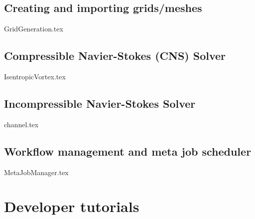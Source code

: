 \documentclass[a4paper,10pt]{report} %
\begin{document}
\chapter{Creating and importing grids/meshes }
\label{sec:GridCreation}
{GridGeneration.tex}



\chapter{Compressible Navier-Stokes (CNS) Solver }
\label{CNS}
{IsentropicVortex.tex}


\chapter{Incompressible Navier-Stokes Solver}
\label{IBM}
{channel.tex}

\chapter{Workflow management and meta job scheduler}
\label{sec:WorkflowMgm}
{MetaJobManager.tex}

\part{Developer tutorials}
\label{sec:Tutorial}
\end{document}
